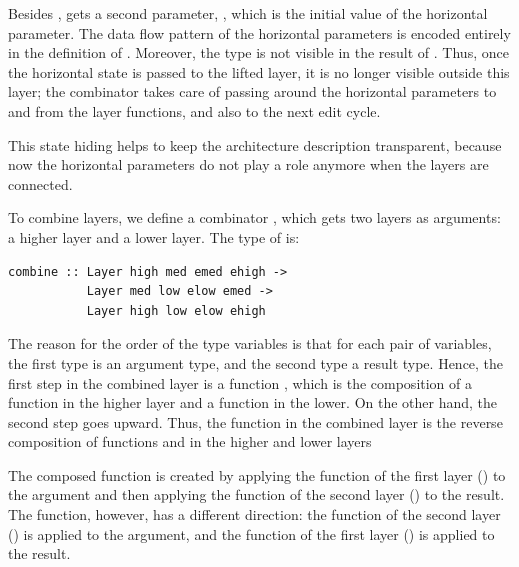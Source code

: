 \documentclass[preprint,natbib]{sigplanconf}
\begin{document}
Besides ,  gets a second parameter, , which is the initial value of the horizontal parameter. The data flow pattern of the horizontal parameters is encoded entirely in the definition of . Moreover, the  type is not visible in the result of . Thus, once the horizontal state is passed to the lifted layer, it is no longer visible outside this layer; the  combinator takes care of passing around the horizontal parameters to and from the layer functions, and also to the next edit cycle. 

\bc This state hiding helps to keep the architecture description transparent, because now the horizontal parameters do not play a role anymore when the layers are connected.
\ec


To combine layers, we define a combinator , which gets two layers as arguments: a higher layer and a lower layer. The type of  is:

\begin{small}
\begin{verbatim}
combine :: Layer high med emed ehigh -> 
           Layer med low elow emed -> 
           Layer high low elow ehigh
\end{verbatim}
\end{small}

The reason for the order of the type variables is that for each pair of variables, the first type is an argument type, and the second type  a result type. Hence, the first step in the combined layer is a function , which is the composition of a function  in the higher layer and a function  in the lower. On the other hand, the second step goes upward.  Thus, the function  in the combined layer is the reverse composition of functions  and  in the higher and lower layers
  
\bc The composed  function is created by applying the  function of the first layer () to the  argument and then applying the  function of the second layer () to the result. The  function, however, has a different direction: the  function of the second layer () is applied to the argument, and the  function of the first layer () is applied to the result. \ec
\end{document}
